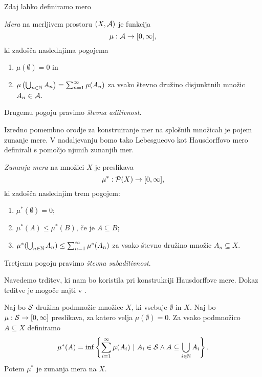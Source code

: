 Zdaj lahko definiramo mero

\begin{definicija}
    \emph{Mera} na merljivem prostoru \((X, \mathcal{A})\) je funkcija 
    \[\mu: \mathcal{A} \to [0, \infty],\]
    ki zadošča naslednjima pogojema
    \begin{enumerate}
        \item \(\mu(\emptyset) = 0\) in
        \item \(\mu\left(\bigcup_{n \in \mathbb{N}} A_n\right) = \sum_{n=1}^{\infty} \mu(A_n)\) za vsako števno družino disjunktnih množic \(A_n \in \mathcal{A}\).
    \end{enumerate}
    Drugemu pogoju pravimo \emph{števna aditivnost}.
\end{definicija}

Izredno pomembno orodje za konstruiranje mer na splošnih množicah je pojem zunanje mere. V nadaljevanju bomo tako Lebesgueovo kot Hausdorffovo mero definirali s pomočjo njunih zunanjih mer.

\begin{definicija}
    \emph{Zunanja mera} na množici \(X\) je preslikava 
    \[\mu^*: \mathcal{P}(X) \to [0, \infty],\]
    ki zadošča naslednjim trem pogojem:
    \begin{enumerate}
        \item \(\mu^*(\emptyset) = 0\);
        \item \(\mu^*(A) \leq \mu^*(B)\), če je \(A \subseteq B\);
        \item \(\mu^*(\bigcup_{n \in \mathbb{N}} A_n) \leq \sum_{n=1}^{\infty} \mu^*(A_n)\) za vsako števno družino množic \(A_n \subseteq X\).
    \end{enumerate}

    Tretjemu pogoju pravimo \emph{števna subaditivnost}.
\end{definicija}

Navedemo trditev, ki nam bo koristila pri konstrukciji Hausdorffove mere. Dokaz trditve je mogoče najti v \cite[stran 20]{mb-otm}.
\begin{trditev}
    \label{zun-mera}
    Naj bo \(\mathcal{S}\) družina podmnožic množice \(X\), ki vsebuje \(\emptyset\) in \(X\). Naj bo \(\mu: \mathcal{S} \to [0, \infty]\) preslikava, za katero velja \(\mu(\emptyset) = 0\). Za vsako podmnožico \(A \subseteq X\) definiramo 
    \[\mu^*(A) = \inf \left\{\sum_{i=1}^{\infty}\mu(A_i) \ | \ A_i \in \mathcal{S} \land A \subseteq \bigcup_{i \in \mathbb{N}} A_i\right\}.\]
    Potem \(\mu^*\) je zunanja mera na \(X\).
\end{trditev}

